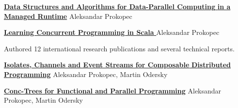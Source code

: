 \documentclass[9pt]{article}
\begin{document}



\medskip

\noindent\href{http://infoscience.epfl.ch/record/200977/files/EPFL_TH6264.pdf}
{\bf Data Structures and Algorithms for Data-Parallel Computing }
\newline
\noindent\href{http://infoscience.epfl.ch/record/200977/files/EPFL_TH6264.pdf}
{\bf in a Managed Runtime}
\newline
\noindent Aleksandar Prokopec
\bigskip


\medskip

\noindent\href{http://www.amazon.com/Learning-Concurrent-Programming-Aleksandar-Prokopec/dp/1783281413/}
{\bf Learning Concurrent Programming in Scala }
\newline
\noindent Aleksandar Prokopec
\bigskip




\noindent
Authored 12 international research publications
and several technical reports.
\newline


\noindent\href{http://axel22.github.io/resources/docs/reactive-isolates.pdf}
{\bf Isolates, Channels and Event Streams for Composable }
\newline
\noindent\href{http://axel22.github.io/resources/docs/reactive-isolates.pdf}
{\bf Distributed Programming}
\dates{}
\newline\noindent Aleksandar Prokopec, Martin Odersky
\newline
{}
\medskip

\noindent\href{http://axel22.github.io/resources/docs/lcpc-conc-trees.pdf}
{\bf Conc-Trees for Functional and Parallel Programming}
\newline\noindent Aleksandar Prokopec, Martin Odersky
\newline
{}
\medskip
\end{document}
